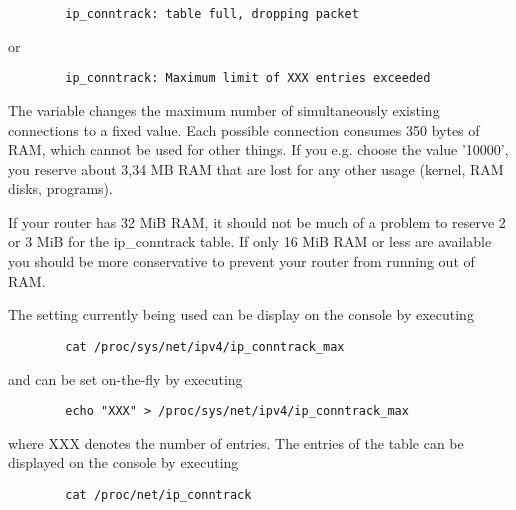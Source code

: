 \begin{description}
\begin{example}
\begin{verbatim}
        ip_conntrack: table full, dropping packet
\end{verbatim}
\end{example}

or

\begin{example}
\begin{verbatim}
        ip_conntrack: Maximum limit of XXX entries exceeded
\end{verbatim}
\end{example}

    The variable  changes the maximum
    number of simultaneously existing connections to a fixed value.
    Each possible connection consumes 350 bytes of RAM, which
    cannot be used for other things. If you e.g. choose the value '10000',
    you reserve about 3,34 MB RAM that are lost for any other usage
    (kernel, RAM disks, programs).

    If your router has 32 MiB RAM, it should not be much of a problem to
    reserve 2 or 3 MiB for the ip\_conntrack table. If only 16 MiB RAM or less
    are available you should be more conservative to prevent your router from
    running out of RAM.

    The setting currently being used can be display on the console by executing

\begin{example}
\begin{verbatim}
        cat /proc/sys/net/ipv4/ip_conntrack_max
\end{verbatim}
\end{example}

    and can be set on-the-fly by executing

\begin{example}
\begin{verbatim}
        echo "XXX" > /proc/sys/net/ipv4/ip_conntrack_max
\end{verbatim}
\end{example}

    where XXX denotes the number of entries.
    The entries of the  table can be displayed on the
    console by executing

\begin{example}
\begin{verbatim}
        cat /proc/net/ip_conntrack
\end{verbatim}
\end{example}


\end{description}
